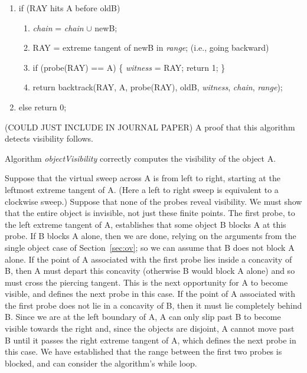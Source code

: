 \documentclass[12pt]{article}
\newif\ifJournal
\begin{document}
\begin{enumerate}
\item 
if (RAY hits A before oldB)
\begin{enumerate}
\item {\em chain} = {\em chain} $\cup$ newB;
\item RAY = extreme tangent of newB in {\em range};  (i.e., going backward)
\item if (probe(RAY) == A) \{ {\em witness} = RAY; return 1; \}
\item return backtrack(RAY, A, probe(RAY), oldB, {\em witness}, {\em chain}, {\em range});
\end{enumerate}
\item else return 0;
\end{enumerate}

(COULD JUST INCLUDE IN JOURNAL PAPER)
A proof that this algorithm detects visibility follows.

\begin{theorem}
Algorithm {\em objectVisibility} correctly computes the visibility of the object A.
\end{theorem}
\prf  
Suppose that the virtual sweep across A is from left to right, 
starting at the leftmost extreme tangent of A.
(Here a left to right sweep is equivalent to a clockwise sweep.)
Suppose that none of the probes reveal visibility.
We must show that the entire object is invisible, not just these finite points.
The first probe, to the left extreme tangent of A, establishes that some object B
blocks A at this probe.
If B blocks A alone, then we are done, relying on the arguments from the single object
case of Section~\ref{sec:ov}; so we can assume that B does not block A alone.
If the point of A associated with the first probe lies inside a concavity of B, 
then A must depart this concavity (otherwise B would block A alone) 
and so must cross the piercing tangent.
This is the next opportunity for A to become visible, and defines the next probe in this
case.
If the point of A associated with the first probe does not lie in a concavity of B,
then it must lie completely behind B.
Since we are at the left boundary of A, A can only slip past B to become visible
towards the right and, since the objects are disjoint, 
A cannot move past B until it passes the right extreme tangent of A,
which defines the next probe in this case.
We have established that the range between the first two probes is blocked,
and can consider the algorithm's while loop.
\end{document}
